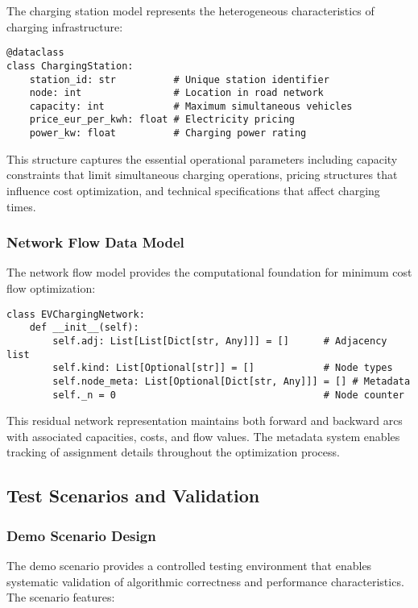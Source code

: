 \documentclass[12pt,a4paper]{article}
\begin{document}
The charging station model represents the heterogeneous characteristics of charging infrastructure:

\begin{lstlisting}[caption=Charging Station Data Structure]
@dataclass
class ChargingStation:
    station_id: str          # Unique station identifier
    node: int                # Location in road network
    capacity: int            # Maximum simultaneous vehicles
    price_eur_per_kwh: float # Electricity pricing
    power_kw: float          # Charging power rating
\end{lstlisting}

This structure captures the essential operational parameters including capacity constraints that limit simultaneous charging operations, pricing structures that influence cost optimization, and technical specifications that affect charging times.

\subsubsection{Network Flow Data Model}

The network flow model provides the computational foundation for minimum cost flow optimization:

\begin{lstlisting}[caption=Network Flow Data Structure]
class EVChargingNetwork:
    def __init__(self):
        self.adj: List[List[Dict[str, Any]]] = []      # Adjacency list
        self.kind: List[Optional[str]] = []            # Node types
        self.node_meta: List[Optional[Dict[str, Any]]] = [] # Metadata
        self._n = 0                                    # Node counter
\end{lstlisting}

This residual network representation maintains both forward and backward arcs with associated capacities, costs, and flow values. The metadata system enables tracking of assignment details throughout the optimization process.

\subsection{Test Scenarios and Validation}

\subsubsection{Demo Scenario Design}

The demo scenario provides a controlled testing environment that enables systematic validation of algorithmic correctness and performance characteristics. The scenario features:
\end{document}
